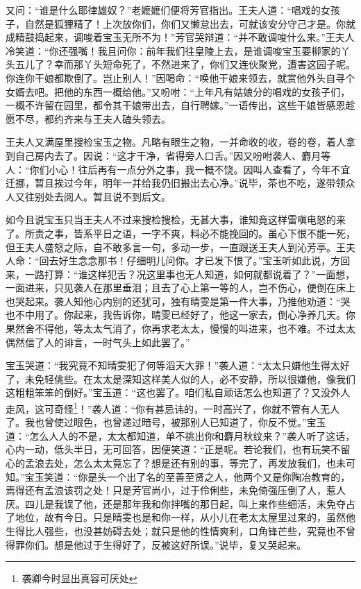 \documentclass[12pt,oneside]{book}
\begin{document}
又问：“谁是什么耶律雄奴？”老嬷嬷们便将芳官指出。王夫人道：“唱戏的女孩子，自然是狐狸精了！上次放你们，你们又懒怠出去，可就该安分守己才是。你就成精鼓捣起来，调唆着宝玉无所不为！”芳官哭辩道：“并不敢调唆什么来。”王夫人冷笑道：“你还强嘴！我且问你：前年我们往皇陵上去，是谁调唆宝玉要柳家的丫头五儿了？幸而那丫头短命死了，不然进来了，你们又连伙聚党，遭害这园子呢。你连你干娘都欺倒了。岂止别人！”因喝命：“唤他干娘来领去，就赏他外头自寻个女婿去吧。把他的东西一概给他。”又吩咐：“上年凡有姑娘分的唱戏的女孩子们，一概不许留在园里，都令其干娘带出去，自行聘嫁。”一语传出，这些干娘皆感恩趁愿不尽，都约齐来与王夫人磕头领去。

王夫人又满屋里搜检宝玉之物。凡略有眼生之物，一并命收的收，卷的卷，着人拿到自己房内去了。因说：“这才干净，省得旁人口舌。”因又吩咐袭人、麝月等人：“你们小心！往后再有一点分外之事，我一概不饶。因叫人查看了，今年不宜迁挪，暂且挨过今年，明年一并给我仍旧搬出去心净。”说毕，茶也不吃，遂带领众人又往别处去阅人。暂且说不到后文。

如今且说宝玉只当王夫人不过来搜检搜检，无甚大事，谁知竟这样雷嗔电怒的来了。所责之事，皆系平日之语，一字不爽，料必不能挽回的。虽心下恨不能一死，但王夫人盛怒之际，自不敢多言一句，多动一步，一直跟送王夫人到沁芳亭。王夫人命：“回去好生念念那书！仔细明儿问你。才已发下恨了。”宝玉听如此说，方回来，一路打算：“谁这样犯舌？况这里事也无人知道，如何就都说着了？”一面想，一面进来，只见袭人在那里垂泪；且去了心上第一等的人，岂不伤心，便倒在床上也哭起来。袭人知他心内别的还犹可，独有晴雯是第一件大事，乃推他劝道：“哭也不中用了。你起来，我告诉你，晴雯已经好了，他这一家去，倒心净养几天。你果然舍不得他，等太太气消了，你再求老太太，慢慢的叫进来，也不难。不过太太偶然信了人的诽言，一时气头上如此罢了。”

宝玉哭道：“我究竟不知晴雯犯了何等滔天大罪！”袭人道：“太太只嫌他生得太好了，未免轻佻些。在太太是深知这样美人似的人，必不安静，所以很嫌他，像我们这粗粗笨笨的倒好。”宝玉道：“这也罢了。咱们私自顽话怎么也知道了？又没外人走风，这可奇怪\footnote{袭卿今时显出真容可厌处}！”袭人道：“你有甚忌讳的，一时高兴了，你就不管有人无人了。我也曾使过眼色，也曾递过暗号，被那别人已知道了，你反不觉。”宝玉道：“怎么人人的不是，太太都知道，单不挑出你和麝月秋纹来？”袭人听了这话，心内一动，低头半日，无可回答，因便笑道：“正是呢。若论我们，也有玩笑不留心的孟浪去处，怎么太太竟忘了？想是还有别的事，等完了，再发放我们，也未可知。”宝玉笑道：“你是头一个出了名的至善至贤之人，他两个又是你陶冶教育的，焉得还有孟浪该罚之处！只是芳官尚小，过于伶俐些，未免倚强压倒了人，惹人厌。四儿是我误了他，还是那年我和你拌嘴的那日起，叫上来作些细活，未免夺占了地位，故有今日。只是晴雯也是和你一样，从小儿在老太太屋里过来的，虽然他生得比人强些，也没甚妨碍去处；就只是他的性情爽利，口角锋芒些，究竟也不曾得罪你们。想是他过于生得好了，反被这好所误。”说毕，复又哭起来。
\end{document}
